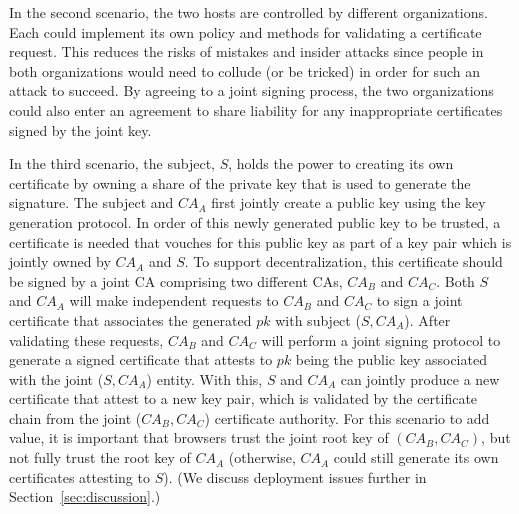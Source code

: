 In the second scenario, the two hosts are controlled by different organizations. Each could implement its own policy and methods for validating a certificate request. This reduces the risks of mistakes and insider attacks since people in both organizations would need to collude (or be tricked) in order for such an attack to succeed.  By agreeing to a joint signing process, the two organizations could also enter an agreement to share liability for any inappropriate certificates signed by the joint key.

In the third scenario, the subject, $S$, holds the power to creating its own certificate by owning a share of the private key that is used to generate the signature. The subject and $CA_A$ first jointly create a public key using the key generation protocol. In order of this newly generated public key to be trusted, a certificate is needed that vouches for this public key as part of a key pair which is jointly owned by $CA_A$ and $S$.  To support decentralization, this certificate should be signed by a joint CA comprising two different CAs, $CA_B$ and $CA_C$. Both $S$ and $CA_A$ will make independent requests to $CA_B$ and $CA_C$ to sign a joint certificate that associates the generated $pk$ with subject ($S, CA_A$). After validating these requests, $CA_B$ and $CA_C$ will perform a joint signing protocol to generate a signed certificate that attests to $pk$ being the public key associated with the joint ($S, CA_A$) entity.  With this, $S$ and $CA_A$ can jointly produce a new certificate that attest to a new key pair, which is validated by the certificate chain from the joint ($CA_B, CA_C$) certificate authority. For this scenario to add value, it is important that browsers trust the joint root key of $(CA_B, CA_C)$, but not fully trust the root key of $CA_A$ (otherwise, $CA_A$ could still generate its own certificates attesting to $S$). (We discuss deployment issues further in Section~\ref{sec:discussion}.)

 
